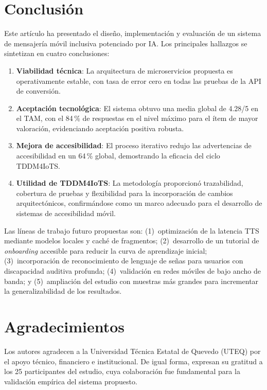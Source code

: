 \documentclass[journal]{IEEEtran}
\begin{document}
\section{Conclusi\'on}
\label{sec:conclusion}

Este art\'iculo ha presentado el dise\~no, implementaci\'on y evaluaci\'on de un sistema de mensajer\'ia m\'ovil inclusiva potenciado por IA. Los principales hallazgos se sintetizan en cuatro conclusiones:

\begin{enumerate}
    \item \textbf{Viabilidad t\'ecnica}: La arquitectura de microservicios propuesta es operativamente estable, con tasa de error cero en todas las pruebas de la API de conversi\'on.
    \item \textbf{Aceptaci\'on tecnol\'ogica}: El sistema obtuvo una media global de 4.28/5 en el TAM, con el 84\,\% de respuestas en el nivel m\'aximo para el \'item de mayor valoraci\'on, evidenciando aceptaci\'on positiva robusta.
    \item \textbf{Mejora de accesibilidad}: El proceso iterativo redujo las advertencias de accesibilidad en un 64\,\% global, demostrando la eficacia del ciclo TDDM4IoTS.
    \item \textbf{Utilidad de TDDM4IoTS}: La metodolog\'ia proporcion\'o trazabilidad, cobertura de pruebas y flexibilidad para la incorporaci\'on de cambios arquitect\'onicos, confirm\'andose como un marco adecuado para el desarrollo de sistemas de accesibilidad m\'ovil.
\end{enumerate}

Las l\'ineas de trabajo futuro propuestas son: (1)~optimizaci\'on de la latencia TTS mediante modelos locales y cach\'e de fragmentos; (2)~desarrollo de un tutorial de \textit{onboarding} accesible para reducir la curva de aprendizaje inicial; (3)~incorporaci\'on de reconocimiento de lenguaje de se\~nas para usuarios con discapacidad auditiva profunda; (4)~validaci\'on en redes m\'oviles de bajo ancho de banda; y (5)~ampliaci\'on del estudio con muestras m\'as grandes para incrementar la generalizabilidad de los resultados.

\section*{Agradecimientos}
Los autores agradecen a la Universidad T\'ecnica Estatal de Quevedo (UTEQ) por el apoyo t\'ecnico, financiero e institucional. De igual forma, expresan su gratitud a los 25 participantes del estudio, cuya colaboraci\'on fue fundamental para la validaci\'on emp\'irica del sistema propuesto.



\end{document}
